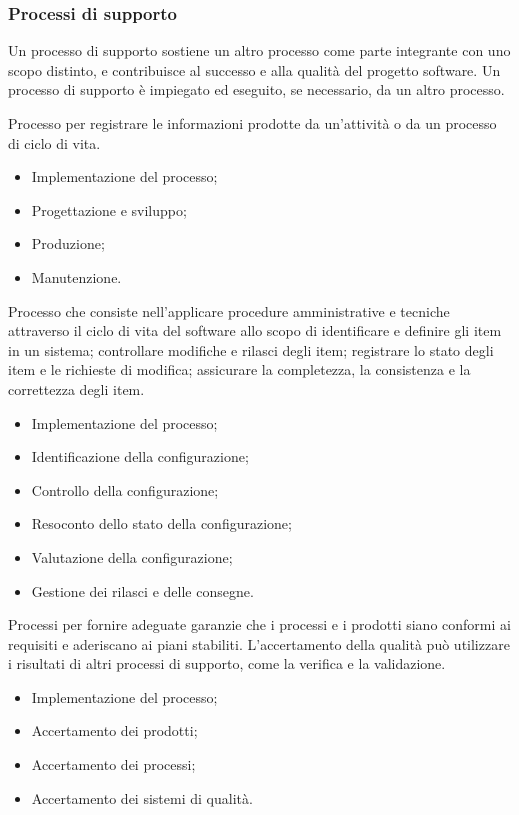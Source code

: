 \subsubsection{Processi di supporto}
Un processo di supporto sostiene un altro processo come parte integrante 
con uno scopo distinto, e contribuisce al successo e alla qualità del progetto software. 
Un processo di supporto è impiegato ed eseguito, se necessario, da un altro processo. 

Processo per registrare le informazioni prodotte da un'attività o
da un processo di ciclo di vita.
\begin{itemize}
    \item Implementazione del processo;
    \item Progettazione e sviluppo;
    \item Produzione;
    \item Manutenzione.
\end{itemize}

Processo che consiste nell'applicare procedure amministrative e tecniche
attraverso il ciclo di vita del software allo scopo di identificare e definire
gli item in un sistema; controllare modifiche e rilasci degli item;
registrare lo stato degli item e le richieste di modifica; assicurare la completezza,
la consistenza e la correttezza degli item.
\begin{itemize}
    \item Implementazione del processo;
    \item Identificazione della configurazione;
    \item Controllo della configurazione;
    \item Resoconto dello stato della configurazione;
    \item Valutazione della configurazione;
    \item Gestione dei rilasci e delle consegne.
\end{itemize}

Processi per fornire adeguate garanzie che i processi e i prodotti
siano conformi ai requisiti e aderiscano ai piani stabiliti.
L'accertamento della qualità può utilizzare i risultati di altri
processi di supporto, come la verifica e la validazione.
\begin{itemize}
    \item Implementazione del processo;
    \item Accertamento dei prodotti;
    \item Accertamento dei processi;
    \item Accertamento dei sistemi di qualità.
\end{itemize}

